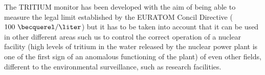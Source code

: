The TRITIUM monitor has been developed with the aim of being able to measure the legal limit established by the EURATOM Concil Directive ($100~\becquerel/\liter$) but it has to be taken into account that it can be used in other different areas such us to control the correct operation of a nuclear facility (high levels of tritium in the water released by the nuclear power plant is one of the first sign of an anomalous functioning of the plant) of even other fields, different to the environmental surveillance, such as research facilities.